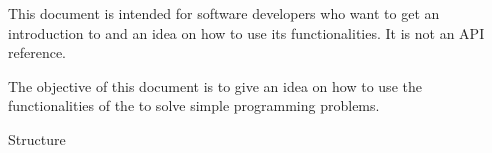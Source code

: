
This document is intended for software developers who want to get an introduction to \embb and an idea on how to use its functionalities. It is not an API reference.


The objective of this document is to give an idea on how to use the functionalities of the \embb to solve simple programming problems. 


Structure